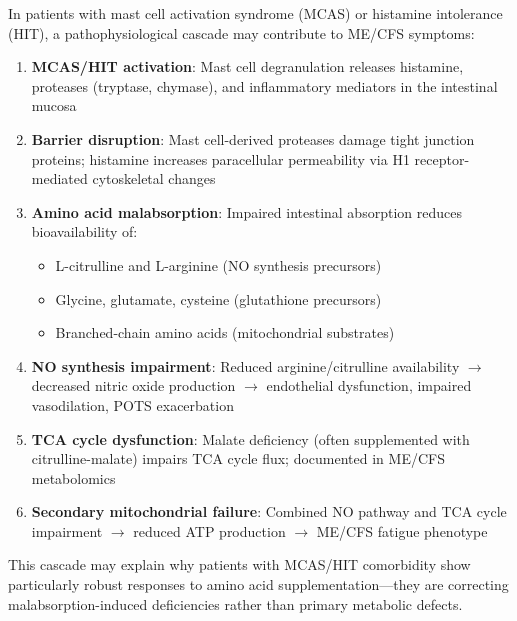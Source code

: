 \begin{hypothesis}
\label{hyp:gut-mito-cascade}
In patients with mast cell activation syndrome (MCAS) or histamine intolerance (HIT), a pathophysiological cascade may contribute to ME/CFS symptoms:

\begin{enumerate}
    \item \textbf{MCAS/HIT activation}: Mast cell degranulation releases histamine, proteases (tryptase, chymase), and inflammatory mediators in the intestinal mucosa
    \item \textbf{Barrier disruption}: Mast cell-derived proteases damage tight junction proteins; histamine increases paracellular permeability via H1 receptor-mediated cytoskeletal changes~\cite{GutPermeability2023}
    \item \textbf{Amino acid malabsorption}: Impaired intestinal absorption reduces bioavailability of:
    \begin{itemize}
        \item L-citrulline and L-arginine (NO synthesis precursors)
        \item Glycine, glutamate, cysteine (glutathione precursors)
        \item Branched-chain amino acids (mitochondrial substrates)
    \end{itemize}
    \item \textbf{NO synthesis impairment}: Reduced arginine/citrulline availability $\rightarrow$ decreased nitric oxide production $\rightarrow$ endothelial dysfunction, impaired vasodilation, POTS exacerbation
    \item \textbf{TCA cycle dysfunction}: Malate deficiency (often supplemented with citrulline-malate) impairs TCA cycle flux; documented in ME/CFS metabolomics~\cite{Yamano2016tca_urea}
    \item \textbf{Secondary mitochondrial failure}: Combined NO pathway and TCA cycle impairment $\rightarrow$ reduced ATP production $\rightarrow$ ME/CFS fatigue phenotype
\end{enumerate}

This cascade may explain why patients with MCAS/HIT comorbidity show particularly robust responses to amino acid supplementation---they are correcting malabsorption-induced deficiencies rather than primary metabolic defects.
\end{hypothesis}

